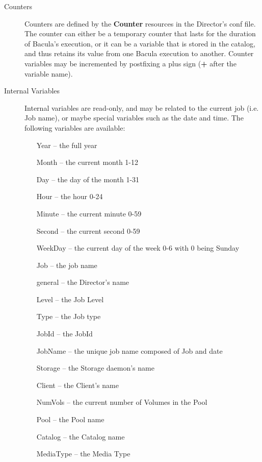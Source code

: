 \begin{description}

\item [Counters]
   Counters are defined by the {\bf Counter}  resources in the Director's conf
file. The counter can either  be a temporary counter that lasts for the
duration of Bacula's  execution, or it can be a variable that is stored in 
the catalog, and thus retains its value from one Bacula execution  to another.
Counter variables may be incremented by postfixing  a plus sign ({\bf +} after
the variable name). 

\item [Internal Variables]
   Internal variables are read-only,  and may be related to the current job (i.e.
Job name), or  maybe special variables such as the date and time.  The
following variables are available:  

\begin{itemize}
\item [Year]  -- the full year  
\item [Month]  -- the current month 1-12  
\item [Day]  -- the day of the month 1-31  
\item [Hour]  -- the hour 0-24  
\item [Minute]  -- the current minute 0-59  
\item [Second]  -- the current second 0-59  
\item [WeekDay]  -- the current day of the week 0-6 with 0 being Sunday  
\item [Job]  -- the job name  
\item [general]  -- the Director's name  
\item [Level]  -- the Job Level 
\item [Type]  -- the Job type 
\item [JobId]  -- the JobId 
\item [JobName]  -- the unique job name composed of Job and date  
\item [Storage]  -- the Storage daemon's name  
\item [Client]  -- the Client's name  
\item [NumVols]  -- the current number of Volumes in the Pool  
\item [Pool]  -- the Pool name  
\item [Catalog]  -- the Catalog name  
\item [MediaType] -- the Media Type  
   \end{itemize}


\end{description}
